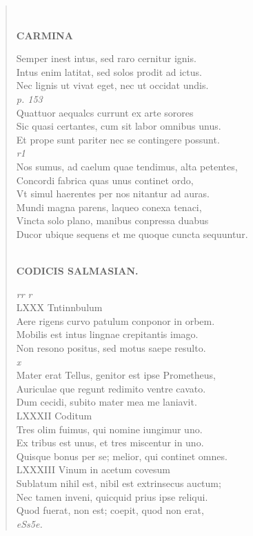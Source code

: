 \documentclass[11pt, a4paper]{report}
\begin{document}
\begin{verse}
        ﻿\pagebreak 
    \begin{center} \textbf{CARMINA} \end{center} \marginpar{[20]} Semper inest intus, sed raro cernitur ignis. \\ Intus enim latitat, sed solos prodit ad ictus. \\ Nec lignis ut vivat eget, nec ut occidat undis. \\ \textit{p. 153} \\ Quattuor aequalcs currunt ex arte sorores \\ Sic quasi certantes, cum sit labor omnibus unus. \\ Et prope sunt pariter nec se contingere possunt. \\ \textit{r1} \\ Nos sumus, ad caelum quae tendimus, alta petentes, \\ Concordi fabrica quas unus continet ordo, \\ Vt simul haerentes per nos nitantur ad auras. \\ Mundi magna parens, laqueo conexa tenaci, \\ Vincta solo plano, manibus conpressa duabus \\ Ducor ubique sequens et me quoque cuncta sequuntur. \\ 
        ﻿\pagebreak 
    \begin{center} \textbf{CODICIS SALMASIAN.} \end{center} \marginpar{[241]} \textit{rr r} \\ LXXX Tntinnbulum \\ Aere rigens curvo patulum conponor in orbem. \\ Mobilis est intus lingnae crepitantis imago. \\ Non resono positus, sed motus saepe resulto. \\ \textit{x} \\ Mater erat Tellus, genitor est ipse Prometheus, \\ Auriculae \lbrack que \rbrack  regunt redimito ventre cavato. \\ Dum cecidi, subito mater mea me laniavit. \\ LXXXII Coditum \\ Tres olim fuimus, qui nomine iungimur uno. \\ Ex tribus est unus, et tres miscentur in uno. \\ Quisque bonus per se; melior, qui continet omnes. \\ LXXXIII Vinum in acetum covesum \\ Sublatum nihil est, nibil est extrinsecus auctum; \\ Nec tamen inveni, quicquid prius ipse reliqui. \\ Quod fuerat, non est; coepit, quod non erat, \\ \textit{eSs5e.} \\ 

\end{verse}
\end{document}
